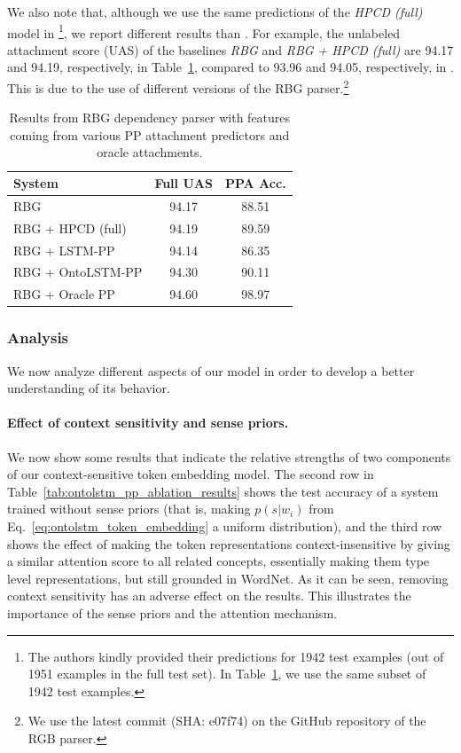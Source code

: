 We also note that, although we use the same predictions of the \textit{HPCD
(full)} model in  \cite{belinkov2014exploring}\footnote{The authors kindly
provided their predictions for 1942 test examples (out of 1951 examples in the
full test set). In Table~\ref{tab:ontolstm_parser_ppa_results}, we use the same
subset of 1942 test examples.}, we report different results than
\cite{belinkov2014exploring}.  For example, the unlabeled attachment score (UAS)
of the baselines \textit{RBG} and \textit{RBG + HPCD (full)} are 94.17 and
94.19, respectively, in Table~\ref{tab:ontolstm_parser_ppa_results}, compared to
93.96 and 94.05, respectively, in \cite{belinkov2014exploring}.  This is due to
the use of different versions of the RBG parser.\footnote{We use the latest
commit (SHA: e07f74) on the GitHub repository of the RGB parser.}

\begin{table}
    \centering
    \begin{tabular}{lcc}
    \toprule
    \textbf{System} & \textbf{Full UAS} & \textbf{PPA Acc.}\\
    \midrule
    RBG               & 94.17 & 88.51 \\
    RBG + HPCD (full) & 94.19 & 89.59 \\
    RBG + LSTM-PP  & 94.14 & 86.35 \\
    RBG + OntoLSTM-PP & 94.30 & 90.11 \\
    RBG + Oracle PP & 94.60 & 98.97 \\
    \bottomrule
    \end{tabular}
    \caption{Results from RBG dependency parser with features coming from various PP attachment predictors and oracle attachments.}\label{tab:ontolstm_parser_ppa_results}
\end{table}

\subsubsection{Analysis}
\label{sec:ontolstm_pp_analysis}
We now analyze different aspects of our model in order to develop a better understanding of its behavior.

\paragraph{Effect of context sensitivity and sense priors.} We now show some results that indicate the relative strengths of two components of our context-sensitive token embedding model. The second row in Table~\ref{tab:ontolstm_pp_ablation_results} shows the test accuracy of a system trained without sense priors (that is, making $p(s|w_i)$ from Eq.~\ref{eq:ontolstm_token_embedding} a uniform distribution), and the third row shows the effect of making the token representations context-insensitive by giving a similar attention score to all related concepts, essentially making them type level representations, but still grounded in WordNet. As it can be seen, removing context sensitivity has an adverse effect on the results.
This illustrates the importance of the sense priors and the attention mechanism.

